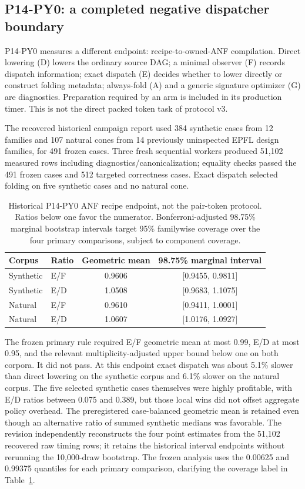 \documentclass[10pt]{article}
\theoremstyle{plain}
\theoremstyle{definition}
\theoremstyle{remark}
\begin{document}
\subsection{P14-PY0: a completed negative dispatcher boundary}

P14-PY0 measures a different endpoint: recipe-to-owned-ANF compilation. Direct lowering (D) lowers the ordinary source DAG; a minimal observer (F) records dispatch information; exact dispatch (E) decides whether to lower directly or construct folding metadata; always-fold (A) and a generic signature optimizer (G) are diagnostics. Preparation required by an arm is included in its production timer. This is not the direct packed token task of protocol v3.

The recovered historical campaign report used 384 synthetic cases from 12 families and 107 natural cones from 14 previously uninspected EPFL design families, for 491 frozen cases. Three fresh sequential workers produced 51,102 measured rows including diagnostics/canonicalization; equality checks passed the 491 frozen cases and 512 targeted correctness cases. Exact dispatch selected folding on five synthetic cases and no natural cone.

\begin{table}[H]
\centering
\small
\begin{tabular}{@{}llcc@{}}
\toprule
\textbf{Corpus} & \textbf{Ratio} & \textbf{Geometric mean} & \textbf{98.75\% marginal interval}\\
\midrule
Synthetic & E/F & 0.9606 & [0.9455, 0.9811]\\
Synthetic & E/D & 1.0508 & [0.9683, 1.1075]\\
Natural & E/F & 0.9610 & [0.9411, 1.0001]\\
Natural & E/D & 1.0607 & [1.0176, 1.0927]\\
\bottomrule
\end{tabular}
\caption{Historical P14-PY0 ANF recipe endpoint, not the pair-token protocol. Ratios below one favor the numerator. Bonferroni-adjusted 98.75\% marginal bootstrap intervals target 95\% familywise coverage over the four primary comparisons, subject to component coverage.}
\label{tab:p14}
\end{table}

The frozen primary rule required E/F geometric mean at most 0.99, E/D at most 0.95, and the relevant multiplicity-adjusted upper bound below one on both corpora. It did not pass. At this endpoint exact dispatch was about 5.1\% slower than direct lowering on the synthetic corpus and 6.1\% slower on the natural corpus. The five selected synthetic cases themselves were highly profitable, with E/D ratios between 0.075 and 0.389, but those local wins did not offset aggregate policy overhead. The preregistered case-balanced geometric mean is retained even though an alternative ratio of summed synthetic medians was favorable. The revision independently reconstructs the four point estimates from the 51,102 recovered raw timing rows; it retains the historical interval endpoints without rerunning the 10,000-draw bootstrap. The frozen analysis uses the 0.00625 and 0.99375 quantiles for each primary comparison, clarifying the coverage label in Table~\ref{tab:p14}.
\end{document}
